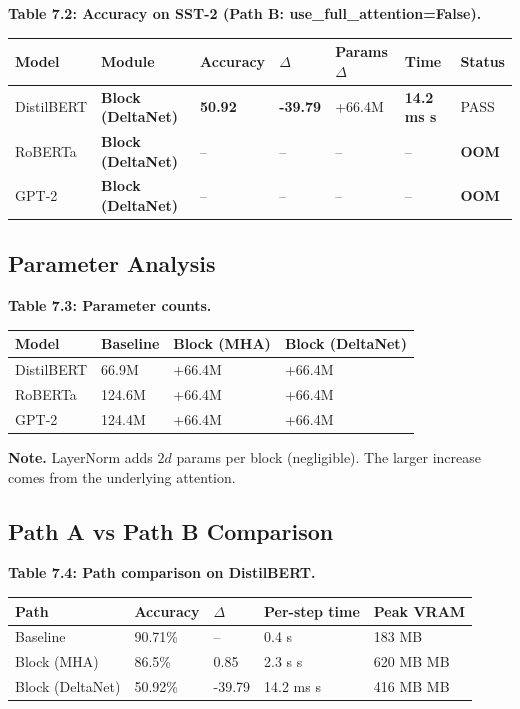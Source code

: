 \textbf{Table 7.2: Accuracy on SST-2 (Path B: use\_full\_attention=False).}

\begin{table}[H]
\centering
\small
\begin{tabular}{lllllll}
\toprule
\textbf{Model} & \textbf{Module} & \textbf{Accuracy} & \textbf{$\Delta$} & \textbf{Params $\Delta$} & \textbf{Time} & \textbf{Status} \\
\midrule
DistilBERT & \textbf{Block (DeltaNet)} & \textbf{50.92} & \textbf{-39.79} & +66.4M & \textbf{14.2 ms s} & PASS \\
RoBERTa & \textbf{Block (DeltaNet)} & -- & -- & -- & -- & \textbf{OOM} \\
GPT-2 & \textbf{Block (DeltaNet)} & -- & -- & -- & -- & \textbf{OOM} \\
\bottomrule
\end{tabular}
\end{table}

\subsection{Parameter Analysis}

\textbf{Table 7.3: Parameter counts.}

\begin{table}[H]
\centering
\small
\begin{tabular}{llll}
\toprule
\textbf{Model} & \textbf{Baseline} & \textbf{Block (MHA)} & \textbf{Block (DeltaNet)} \\
\midrule
DistilBERT & 66.9M & +66.4M & +66.4M \\
RoBERTa & 124.6M & +66.4M & +66.4M \\
GPT-2 & 124.4M & +66.4M & +66.4M \\
\bottomrule
\end{tabular}
\end{table}

\textbf{Note.} LayerNorm adds $2d$ params per block (negligible). The larger 
increase comes from the underlying attention.

\subsection{Path A vs Path B Comparison}

\textbf{Table 7.4: Path comparison on DistilBERT.}

\begin{table}[H]
\centering
\small
\begin{tabular}{lllll}
\toprule
\textbf{Path} & \textbf{Accuracy} & \textbf{$\Delta$} & \textbf{Per-step time} & \textbf{Peak VRAM} \\
\midrule
Baseline & 90.71\% & -- & 0.4 s & 183 MB \\
Block (MHA) & 86.5\% & 0.85 & 2.3 s s & 620 MB MB \\
Block (DeltaNet) & 50.92\% & -39.79 & 14.2 ms s & 416 MB MB \\
\bottomrule
\end{tabular}
\end{table}

